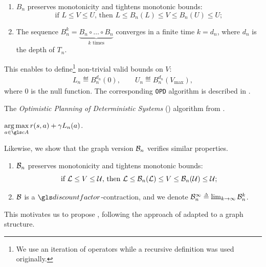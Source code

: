 \begin{lemma}[Properties of $B_n$]
	\begin{leftbar}[lemmabar]
	\label{lem:properties-b-tree}
	\begin{enumerate}[label=(\roman*)]
		\item $B_n$ preserves monotonicity and tightens monotonic bounds: $$
		\text{if } L\leq V\leq U \text{, then } L \leq B_n(L) \leq V \leq B_n(U) \leq U;
		$$
		\item The sequence $B_n^k = \underbrace{B_n \circ \dots\circ B_n}_{\text{$k$ times}} $ converges in a finite time $k=d_n$, where $d_n$ is the depth of $T_n$. 
	\end{enumerate}
	\end{leftbar}
\end{lemma}
This enables \citet{Hren2008} to define\footnote{We use an iteration of operators while a recursive definition was used originally.} non-trivial valid bounds on $V$:
\begin{align}
\label{eq:opd-bounds}
L_n \eqdef B_n^{d_n}(0), \qquad U_n \eqdef B_n^{d_n}(V_{\max}),
\end{align}
where $0$ is the null function.
The corresponding \texttt{OPD} algorithm is described in .

\begin{algorithm}[!ht]
	\caption{The \emph{Optimistic Planning of Deterministic Systems} (\OPD) algorithm from \citep{Hren2008}.}
	\label{alg:opd}
	\DontPrintSemicolon
	\Return $\displaystyle\argmax_{a\in \cA} r(s, a) + \gamma L_n(a)$. \;
\end{algorithm}


 Likewise, we show that the graph version $\cB_n$ verifies similar properties.
\begin{lemma}[Properties of $\cB_n$]
	\begin{leftbar}[lemmabar]
	\label{lem:properties-b-graph}
	\begin{enumerate}[label=(\roman*)]
		\item $\cB_n$ preserves monotonicity and tightens monotonic bounds: $$
		\text{if } \mathcal{L}\leq V\leq \mathcal{U} \text{, then } \mathcal{L} \leq \mathcal{B}_n(\mathcal{L}) \leq V \leq \mathcal{B}_n(\mathcal{U}) \leq \mathcal{U};
		$$
		\item $\mathcal{B}$ is a $\discount$-contraction, and we denote $\cB_n^{\infty} \eqdef \lim_{k\rightarrow \infty} \cB_n^k$.
	\end{enumerate}
	\end{leftbar}
\end{lemma}
This motivates us to propose , following the approach of  adapted to a graph structure.

